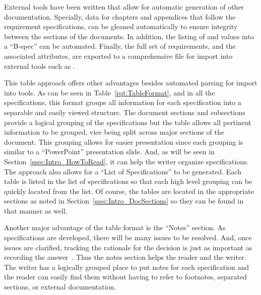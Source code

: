External tools have been written that allow for automatic generation of other documentation.
Specially, data for chapters and appendices that follow the requirement specifications, can be gleaned automatically to ensure integrity between the sections of the documents.
In addition, the listing of \KPP and \KSA values into a ``B-spec'' can be automated.
Finally, the full set of requirements, and the associated attributes, are exported to a comprehensive \CSV file for import into external tools such as \DOORS.


This table approach offers other advantages besides automated parsing for import into tools.
As can be seen in Table~\ref{rqt:TableFormat}, and in all the specifications, this format groups all information for each specification into a separable and easily viewed structure.
The document sections and subsections provide a logical grouping of the specifications but the table allows all pertinent information to be grouped, vice being split across major sections of the document.
This grouping allows for easier presentation since each grouping is similar to a ``PowerPoint'' presentation slide.
And, as will be seen in Section~\ref{ssec:Intro_HowToRead}, it can help the writer organize specifications.
The approach also allows for a ``List of Specifications'' to be generated.
Each table is listed in the list of specifications so that each high level grouping can be quickly located from the list.
Of course, the tables are located in the appropriate sections as noted in Section~\ref{ssec:Intro_DocSections} so they can be found in that manner as well.


Another major advantage of the table format is the ``Notes'' section.
As specifications are developed, there will be many issues to be resolved.
And, once issues are clarified, tracking the rationale for the decision is just as important as recording the answer~\cite{ref__Brooks_MMM}.
Thus the notes section helps the reader and the writer.
The writer has a logically grouped place to put notes for each specification and the reader can easily find them without having to refer to footnotes, separated sections, or external documentation.

